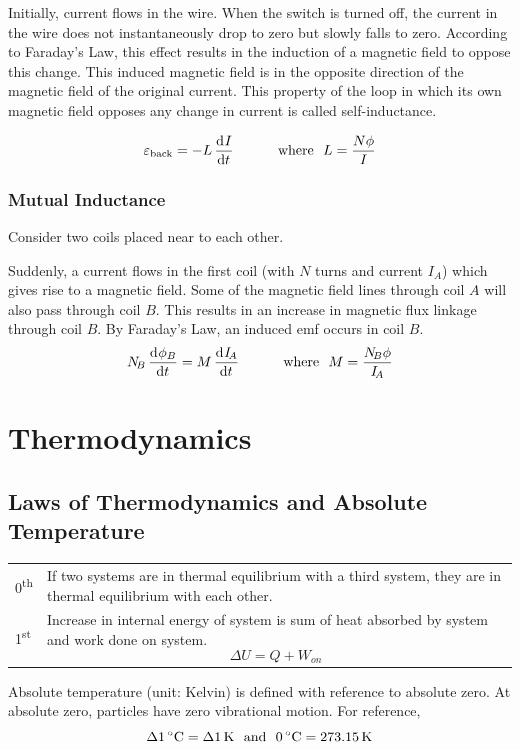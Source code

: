 \documentclass[11pt]{article}
\numberwithin{equation}{section}
\begin{document}
				Initially, current flows in the wire. When the switch is turned off, the current in the wire does not instantaneously drop to zero but slowly falls to zero. According to Faraday’s Law, this effect results in the induction of a magnetic field to oppose this change. This induced magnetic field is in the opposite direction of the magnetic field of the original current. This property of the loop in which its own magnetic field opposes any change in current is called self-inductance.
				
				\begin{equation*}
					\varepsilon_{\text{back}}=-L\dod{I}{t} \text{~~~~~~~~~where~~} L = \frac{N\phi}{I}
				\end{equation*}
			\pagebreak
			\subsubsection{Mutual Inductance}
				Consider two coils placed near to each other. 
				
				Suddenly, a current flows in the first coil (with $N$ turns and current $I_{\!A}$) which gives rise to a magnetic field. Some of the magnetic field lines through coil $A$ will also pass through coil $B$. This results in an increase in magnetic flux linkage through coil $B$. By Faraday’s Law, an induced emf occurs in coil $B$.
				\begin{equation*}
					N_{\!B}\dod{\phi_B}{t} = M\dod{I_{\!A}}{t} \text{~~~~~~~~~where~~} M=\frac{N_{\!B}\phi}{I_{\!A}}
					\vspace{-0.5em}
				\end{equation*}
	\section{Thermodynamics}
		\subsection{Laws of Thermodynamics and Absolute Temperature}
			\vspace{-0.5em}
			\begin{center}
				\renewcommand{\arraystretch}{1.2}
				\begin{tabular}{@{} l p{13cm} @{}}
					\toprule
					0\textsuperscript{th} & If two systems are in thermal equilibrium with a third system, they are in thermal equilibrium with each other. \\
					1\textsuperscript{st} & Increase in internal energy of system is sum of heat absorbed by system and work done on system. $$\Delta U = Q + W_{on}$$ \vspace*{-\baselineskip} \\
					\bottomrule
				\end{tabular}
			\end{center}
			 Absolute temperature (unit: Kelvin) is defined with reference to absolute zero. At absolute zero, particles have zero vibrational motion. For reference,
			 \begin{equation*}
				 \Delta \SI{1}{\degreeCelsius} = \Delta \SI{1}{\K} \text{~~and~~} \SI{0}{\degreeCelsius} = \SI{273.15}{\K}
				 \vspace{-0.5em}
			 \end{equation*}
\end{document}
